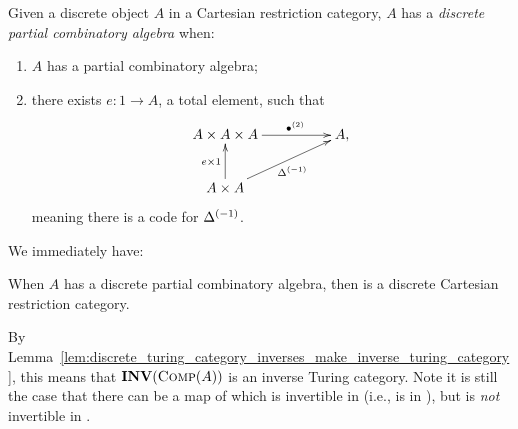 \begin{definition}\label{def:discrete_pca}
  Given a discrete object $A$ in a Cartesian restriction category, $A$ has a \emph{discrete partial
    combinatory algebra} when:
  \begin{enumerate}[{(}i{)}]
  \item $A$ has a partial combinatory algebra;
  \item there exists $e:1\to A$, a total element, such that
    \[
      \xymatrix@C+25pt{
        A\times A \times A\ar[r]^(.6){\multibullet{2}} & A, \\
        A\times A  \ar[u]^{e\times 1} \ar[ur]_{\inv{\Delta}}
      }
    \]
    meaning there is a code for ${\Delta}^{(-1)}$.
  \end{enumerate}
\end{definition}

We immediately have:
\begin{lemma}\label{lem:comp_a_is_discrete_cart}
  When $A$ has a discrete partial combinatory algebra, then \compa is a discrete Cartesian
  restriction category.
\end{lemma}
By Lemma~\ref{lem:discrete_turing_category_inverses_make_inverse_turing_category}, this means that
$\mathbf{INV}({\textsc{Comp}(A)})$ is an inverse Turing category. Note it is still the case that there can be a map of
\compa which is invertible in \Xt (i.e., is in \X), but is \emph{not} invertible in \compa.


